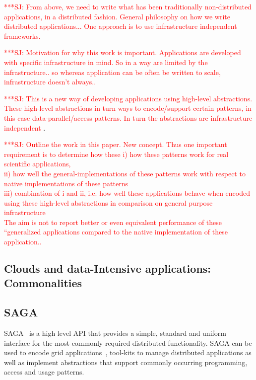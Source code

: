 \documentclass[conference,final]{IEEEtran}
\newcommand{\jhanote}[1]{ {\textcolor{red} { ***SJ: #1 }}}
\newcommand{\jhanote}[1]{}
\begin{document}
\jhanote{From above, we need to write what has been traditionally
  non-distributed applications, in a distributed fashion. General
  philosophy on how we write distributed applications... One approach
  is to use infrastructure independent frameworks.}

\jhanote{Motivation for why this work is important. Applications
  are developed with specific infrastructure in mind. So in a
  way are limited by the infrastructure.. so whereas application
  can be often be written to scale, infrastructure doesn't
  always..}

\jhanote{This is a new way of developing applications using high-level
  abstractions. These high-level abstractions in turn ways to
  encode/support certain patterns, in this case data-parallel/access
  patterns. In turn the abstractions are infrastructure independent}.


\jhanote{Outline the work in this paper. New concept. Thus one
  important requirement is to determine how these
  i) how these patterns work for real scientific applications, \\
  ii) how well the general-implementations of these patterns work with
  respect to native implementations of these patterns \\
  iii) combination of i and ii, i.e. how well these applications
  behave when encoded using these high-level abstractions
  in comparison on general purpose infrastructure\\
  The aim is not to report better or even equivalent performance of
  these ``generalized applications compared to the native
  implementation of these application..}


\subsection{Clouds and data-Intensive applications: Commonalities}

\subsection{SAGA}
SAGA~\cite{saga_gfd90} is a high level API that provides a simple,
standard and uniform interface for the most commonly required
distributed functionality.  SAGA can be used to encode grid
applications~\cite{saga_escience07, saga_tg08}, tool-kits to manage
distributed applications as well as implement abstractions that
support commonly occurring programming, access and usage patterns.
\end{document}
